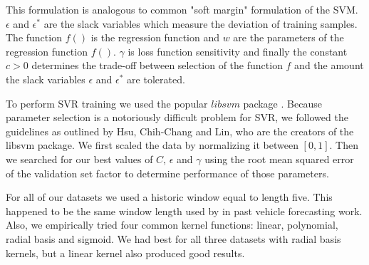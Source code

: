 This formulation  is analogous to common "soft margin" formulation of the SVM.   $\epsilon$ and $\epsilon^{*}$ are the slack variables which measure the deviation of training samples.  The function $f()$ is the regression function and $w$ are the parameters of the regression function $f()$.  $\gamma$ is loss function sensitivity and finally the constant $c > 0$ determines the trade-off between selection of the function $f$ and the amount the slack variables $\epsilon$ and $\epsilon^{*}$ are tolerated.  

To perform SVR training we used the popular $libsvm$ package \cite{Hsu2003}.  Because parameter selection is a notoriously difficult problem for SVR, we followed the guidelines as outlined by Hsu, Chih-Chang and Lin, who are the creators of the libsvm package.  We first scaled the data by normalizing it between $[0, 1]$.  Then we searched for our best values of $C$, $\epsilon$ and $\gamma$ using the root mean squared error of the validation set factor to determine performance of those parameters. 

For all of our datasets we used a historic window equal to length five.  This happened to be the same window length used by \cite{Wu2004} in past vehicle forecasting work.  Also, we empirically tried four common kernel functions: linear, polynomial, radial basis and sigmoid.  We had best for all three datasets with radial basis kernels, but a linear kernel also produced good results.

